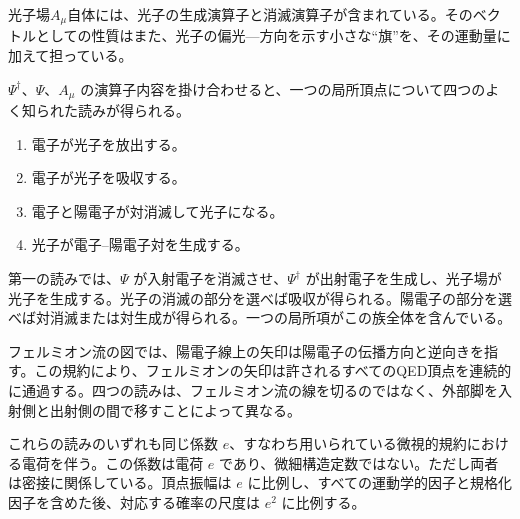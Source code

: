 光子場\(A_\mu\)自体には、光子の生成演算子と消滅演算子が含まれている。そのベクトルとしての性質はまた、光子の偏光---方向を示す小さな``旗''を、その運動量に加えて担っている。

\begin{classroomqa}
\end{classroomqa}

\(\Psi^\dagger\)、\(\Psi\)、\(A_\mu\) の演算子内容を掛け合わせると、一つの局所頂点について四つのよく知られた読みが得られる。
\begin{enumerate}
\item 電子が光子を放出する。
\item 電子が光子を吸収する。
\item 電子と陽電子が対消滅して光子になる。
\item 光子が電子--陽電子対を生成する。
\end{enumerate}
第一の読みでは、\(\Psi\) が入射電子を消滅させ、\(\Psi^\dagger\) が出射電子を生成し、光子場が光子を生成する。光子の消滅の部分を選べば吸収が得られる。陽電子の部分を選べば対消滅または対生成が得られる。一つの局所項がこの族全体を含んでいる。

フェルミオン流の図では、陽電子線上の矢印は陽電子の伝播方向と逆向きを指す。この規約により、フェルミオンの矢印は許されるすべてのQED頂点を連続的に通過する。四つの読みは、フェルミオン流の線を切るのではなく、外部脚を入射側と出射側の間で移すことによって異なる。

これらの読みのいずれも同じ係数 \(e\)、すなわち用いられている微視的規約における電荷を伴う。この係数は電荷 \(e\) であり、微細構造定数ではない。ただし両者は密接に関係している。頂点振幅は \(e\) に比例し、すべての運動学的因子と規格化因子を含めた後、対応する確率の尺度は \(e^2\) に比例する。

\begin{classroomqa}
\end{classroomqa}

\begin{classroomqa}
\end{classroomqa}

